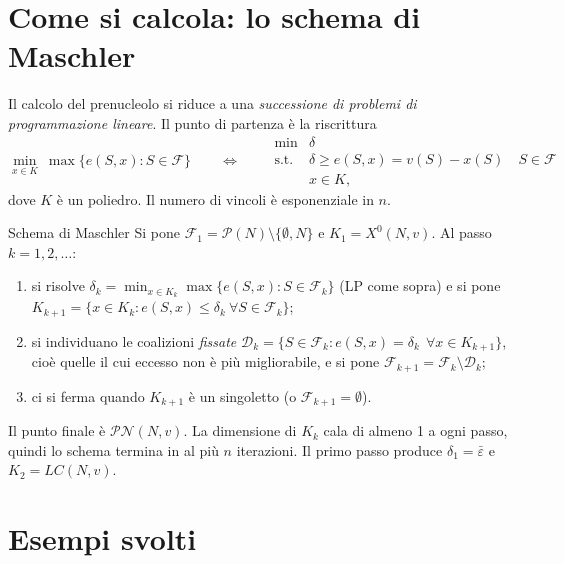 \documentclass[12pt,a4paper,twoside]{book}
\theoremstyle{plain}
\theoremstyle{definition}
\begin{document}
\section{Come si calcola: lo schema di Maschler}

Il calcolo del prenucleolo si riduce a una \emph{successione di problemi di
programmazione lineare}. Il punto di partenza è la riscrittura
\[
  \min_{x\in K}\ \max\{e(S,x):S\in\mathcal{F}\}
  \qquad\Longleftrightarrow\qquad
  \begin{array}{ll}
    \min & \delta\\
    \text{s.t.} & \delta\ge e(S,x)=v(S)-x(S)\quad S\in\mathcal{F}\\
                & x\in K,
  \end{array}
\]
dove $K$ è un poliedro. Il numero di vincoli è esponenziale in $n$.

\begin{defbox}{Schema di Maschler}
Si pone $\mathcal{F}_1=\mathcal{P}(N)\setminus\{\emptyset,N\}$ e $K_1=X^{0}(N,v)$.
Al passo $k=1,2,\dots$:
\begin{enumerate}
  \item si risolve $\displaystyle \delta_k=\min_{x\in K_k}\max\{e(S,x):S\in\mathcal{F}_k\}$
        (LP come sopra) e si pone
        $K_{k+1}=\{x\in K_k: e(S,x)\le\delta_k\ \forall S\in\mathcal{F}_k\}$;
  \item si individuano le coalizioni \emph{fissate}
        $\mathcal{D}_k=\{S\in\mathcal{F}_k: e(S,x)=\delta_k\ \ \forall x\in K_{k+1}\}$,
        cioè quelle il cui eccesso non è più migliorabile, e si pone
        $\mathcal{F}_{k+1}=\mathcal{F}_k\setminus\mathcal{D}_k$;
  \item ci si ferma quando $K_{k+1}$ è un singoletto (o $\mathcal{F}_{k+1}=\emptyset$).
\end{enumerate}
Il punto finale è $\mathcal{PN}(N,v)$. La dimensione di $K_k$ cala di almeno 1 a
ogni passo, quindi lo schema termina in al più $n$ iterazioni. Il primo passo
produce $\delta_1=\bar\varepsilon$ e $K_2=LC(N,v)$.
\end{defbox}

\section{Esempi svolti}
\end{document}
